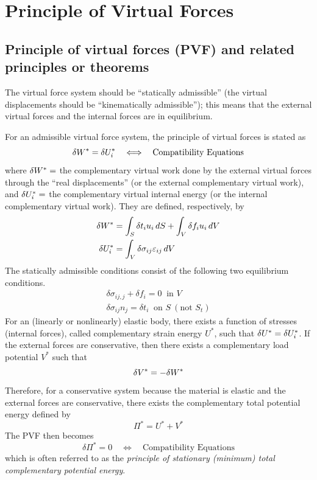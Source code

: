 \chapter{Principle of Virtual Forces}
\label{ch:pvf}

\section{Principle of virtual forces (PVF) and related principles or theorems}
The virtual force system should be ``statically admissible'' (the virtual displacements should be ``kinematically admissible''); this means that the external virtual forces and the internal forces are in equilibrium.

For an admissible virtual force system, the principle of virtual forces is stated as
\begin{equation}
  \delta W^* = \delta U_i^* \quad\Longleftrightarrow\quad \text{Compatibility Equations}
\end{equation}
where $\delta W^* =$ the complementary virtual work done by the external virtual forces through the ``real displacements'' (or the external complementary virtual work), and $\delta U_i^* =$ the complementary virtual internal energy (or the internal complementary virtual work). They are defined, respectively, by
\begin{align}
  \delta W^* &= \int_S\delta t_iu_i\,dS + \int_V\delta f_iu_i\,dV\\
  \delta U_i^* &= \int_V\delta\sigma_{ij}\varepsilon_{ij}\,dV
\end{align}
The statically admissible conditions consist of the following two equilibrium conditions.
\begin{gather*}
  \delta\sigma_{ij,j} + \delta f_i = 0\ \text{ in } V\\
  \delta\sigma_{ij}n_j = \delta t_i\ \text{ on } S\ (\text{not } S_t)
\end{gather*}
For an (linearly or nonlinearly) elastic body, there exists a function of stresses (internal forces), called complementary strain energy $U^*$, such that $\delta U^* = \delta U_i^*$. If the external forces are conservative, then there exists a complementary load potential $V^*$ such that
\begin{equation*}
  \delta V^* = -\delta W^*
\end{equation*}
Therefore, for a conservative system because the material is elastic and the external forces are conservative, there exists the complementary total potential energy defined by
\begin{equation*}
  \Pi^* = U^* + V^*
\end{equation*}
The PVF then becomes
\begin{equation}
  \delta\Pi^* = 0 \quad\Longleftrightarrow\quad \text{Compatibility Equations}
\end{equation}
which is often referred to as the \emph{principle of stationary (minimum) total complementary potential energy}.

